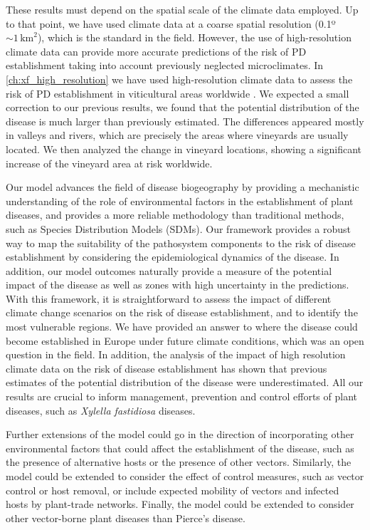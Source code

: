 These results must depend on the spatial scale of the climate data employed. Up
to that point, we have used climate data at a coarse spatial resolution
(0.1º$\sim 1 \, \textrm{km}^2$), which is the standard in the field.
However, the use of high-resolution climate data can provide more accurate
predictions of the risk of PD establishment taking into account previously
neglected microclimates. In \cref{ch:xf_high_resolution} we have used
high-resolution climate data to assess the risk of PD establishment in
viticultural areas worldwide \cite{GimenezRomero2024}. We expected a small
correction to our previous results, we found that the potential distribution of
the disease is much larger than previously estimated. The differences appeared
mostly in valleys and rivers, which are precisely the areas where vineyards are
usually located. We then analyzed the change in vineyard locations, showing a
significant increase of the vineyard area at risk worldwide.

Our model advances the field of disease biogeography by providing a mechanistic
understanding of the role of environmental factors in the establishment of
plant diseases, and provides a more reliable methodology than traditional
methods, such as Species Distribution Models (SDMs). Our framework
provides a robust way to map the suitability of the pathosystem components to
the risk of disease establishment by considering the  epidemiological dynamics
of the disease. In addition, our model outcomes naturally provide a measure of
the potential impact of the disease as well as zones with high uncertainty in
the predictions. With this framework, it is straightforward to assess the
impact of different climate change scenarios on the risk of disease
establishment, and to identify the most vulnerable regions. We have provided an
answer to where the disease could become established in Europe under future
climate conditions, which was an open question in the field. In addition, the
analysis of the impact of high resolution climate data on the risk of disease
establishment has shown that previous estimates of the potential distribution
of the disease were underestimated. All our results are crucial to inform
management, prevention and control efforts of plant diseases, such as
\textit{Xylella fastidiosa} diseases.

Further extensions of the model could go in the direction of incorporating
other environmental factors that could affect the establishment of the disease,
such as the presence of alternative hosts or the presence of other vectors.
Similarly, the model could be extended to consider the effect of control
measures, such as vector control or host removal, or include expected mobility
of vectors and infected hosts by plant-trade networks. Finally, the model could
be extended to consider other vector-borne plant diseases than Pierce's
disease.

